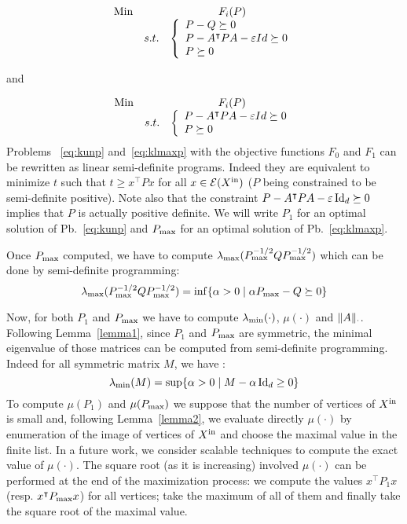 \documentclass[10pt]{article}
\begin{document}
\begin{equation}
\label{eq:kunp}
\begin{array}{llc}
\operatorname*{Min} & &F_i(P)\\
 & s. t. &\left\{\begin{array}{l} 
         P-Q\succeq 0\\
         P-A^\intercal P A-\varepsilon Id\succeq 0\\
         P\succeq  0
        \end{array}\right.
\end{array}
\end{equation}

and

\begin{equation}
\label{eq:klmaxp}
\begin{array}{llc}
\operatorname*{Min} & & F_i(P)\\
 & s. t. &\left\{\begin{array}{l} 
         P-A^\intercal P A-\varepsilon Id\succeq 0\\
         P\succeq  0
        \end{array}\right.
\end{array}
\end{equation}
Problems ~\eqref{eq:kunp} and~\eqref{eq:klmaxp} with the objective functions $F_0$ and $F_1$ can be rewritten as linear semi-definite programs. Indeed they are equivalent to minimize $t$ such that $t\geq x^\intercal P x$ for all $x\in\mathcal{E}( X^\mathrm{in})$ ($P$ being constrained to be semi-definite positive). Note also that the constraint $P-A^\intercal P A-\varepsilon \operatorname{Id}_d\succeq 0$ implies that $P$ is actually positive definite.  
We will write $P_1$ for an optimal solution of Pb.~\eqref{eq:kunp} and $P_{\mathrm{max}}$ for an optimal solution of Pb.~\eqref{eq:klmaxp}. 


Once $P_{\mathrm{max}}$ computed, we have to compute $\lambda_{\operatorname{max}}(P_{\mathrm{max}}^{-1/2}Q P_{\mathrm{max}}^{-1/2})$ which can be done by semi-definite programming:
\[
\lambda_{\operatorname{max}}(P_{\mathrm{max}}^{-1/2}Q P_{\mathrm{max}}^{-1/2})=\inf\{\alpha>0\mid \alpha P_{\mathrm{max}}-Q\succeq 0\}
\] 

Now, for both $P_1$ and $P_{\mathrm{max}}$ we have to compute $\lambda_{\operatorname{min}}(\cdot)$, $\mu(\cdot)$ and $\| A\|_{\cdot}$. Following Lemma~\ref{lemma1}, since $P_1$ and $P_{\mathrm{max}}$ are symmetric, the minimal eigenvalue
of those matrices can be computed from semi-definite programming. Indeed for all symmetric matrix $M$, we have : 
\[
\lambda_{\operatorname{min}}(M)=\sup\{\alpha>0\mid M-\alpha \operatorname{Id}_d\geq 0\}
\] 
To compute $\mu(P_1)$ and $\mu(P_{\mathrm{max}})$ we suppose that the number of vertices of $X^\mathrm{in}$ is small and, following Lemma~\ref{lemma2}, we evaluate directly $\mu(\cdot)$ by enumeration of the image of vertices of $X^\mathrm{in}$ and choose the maximal value in the finite list. In a future work, we consider scalable techniques to compute the exact value of $\mu(\cdot)$. The square root (as it is increasing) involved $\mu(\cdot)$ can be performed at the end of the maximization process: we compute the values $x^\intercal P_1 x$ (resp. $x^\intercal P_{\mathrm{max}} x$) for all vertices; take the maximum of all of them and finally take the square root of the maximal value. 
\end{document}
